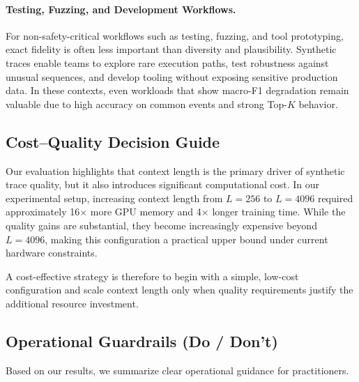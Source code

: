 \paragraph{Testing, Fuzzing, and Development Workflows.}
For non-safety-critical workflows such as testing, fuzzing, and tool prototyping, exact fidelity is often less important than diversity and plausibility. Synthetic traces enable teams to explore rare execution paths, test robustness against unusual sequences, and develop tooling without exposing sensitive production data. In these contexts, even workloads that show macro-F1 degradation remain valuable due to high accuracy on common events and strong Top-$K$ behavior.

\subsection{Cost–Quality Decision Guide}

Our evaluation highlights that context length is the primary driver of synthetic trace quality, but it also introduces significant computational cost. 
In our experimental setup, increasing context length from $L=256$ to $L=4096$ required approximately 16$\times$ more GPU memory and 4$\times$ longer training time. While the quality gains are substantial, they become increasingly expensive beyond $L=4096$, making this configuration a practical upper bound under current hardware constraints.

A cost-effective strategy is therefore to begin with a simple, low-cost configuration and scale context length only when quality requirements justify the additional resource investment.

\subsection{Operational Guardrails (Do / Don’t)}

Based on our results, we summarize clear operational guidance for practitioners.

